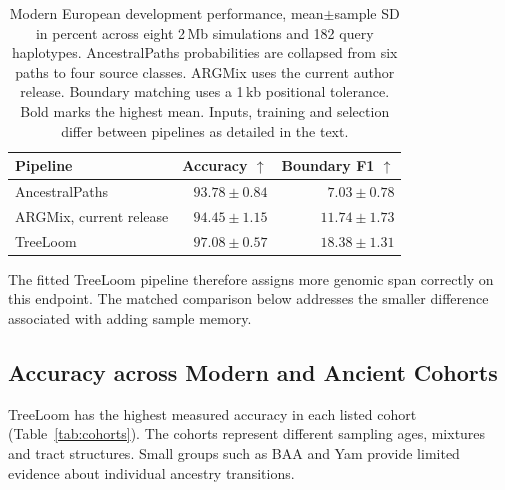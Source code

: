 \documentclass[letterpaper]{article}
\newcommand{\best}[1]{\mathbf{#1}}
\begin{document}
\begin{table}[t]
\centering
\small
\begin{tabular}{@{}lrr@{}}
\toprule
Pipeline & Accuracy $\uparrow$ & Boundary F1 $\uparrow$\\
\midrule
AncestralPaths &$93.78\pm0.84$&$7.03\pm0.78$\\
ARGMix, current release &$94.45\pm1.15$&$11.74\pm1.73$\\
TreeLoom &$\best{97.08\pm0.57}$&$\best{18.38\pm1.31}$\\
\bottomrule
\end{tabular}
\caption{Modern European development performance, mean$\pm$sample SD in percent across eight 2\,Mb simulations and 182 query haplotypes. AncestralPaths probabilities are collapsed from six paths to four source classes. ARGMix uses the current author release. Boundary matching uses a 1\,kb positional tolerance. Bold marks the highest mean. Inputs, training and selection differ between pipelines as detailed in the text.}
\label{tab:pipeline}
\end{table}

The fitted TreeLoom pipeline therefore assigns more genomic span correctly on this endpoint. The matched comparison below addresses the smaller difference associated with adding sample memory.

\subsection{Accuracy across Modern and Ancient Cohorts}
TreeLoom has the highest measured accuracy in each listed cohort (Table~\ref{tab:cohorts}). The cohorts represent different sampling ages, mixtures and tract structures. Small groups such as BAA and Yam provide limited evidence about individual ancestry transitions.
\end{document}
